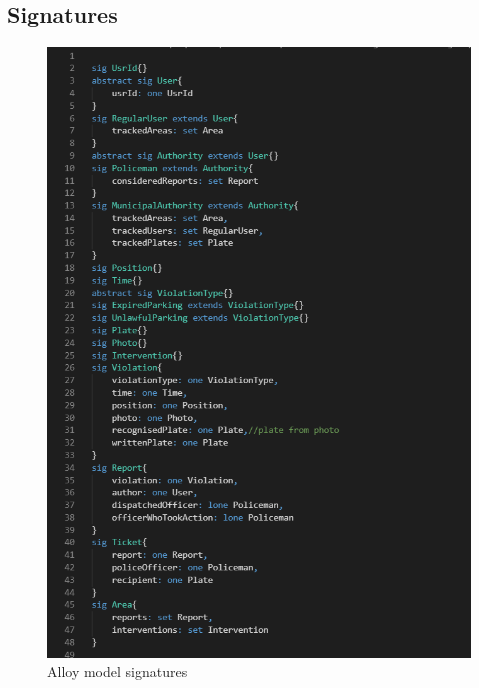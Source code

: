 \subsection{Signatures}
\begin{figure}[h!]
	\centering
	\includegraphics[scale=0.85 ]{Images/Signatures_1-2}
	\caption{Alloy model signatures}
\end{figure}
\newpage
